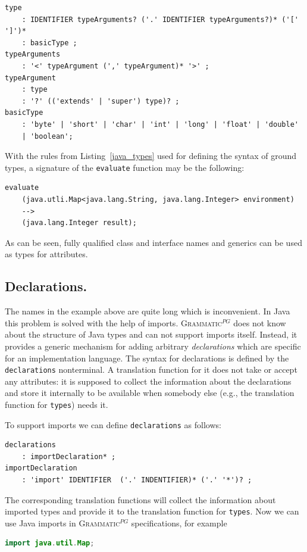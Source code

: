 \documentclass{informat} %
\newcommand{\lstref}[1]{Listing~\ref{#1}}
\newcommand{\ATF}{\textsc{Grammatic}$^{PG}$}
\begin{document}
{\begin{lstlisting}[caption=Ground type syntax for Java 5,float=htbp,label=java_types]
type
	: IDENTIFIER typeArguments? ('.' IDENTIFIER typeArguments?)* ('[' ']')*
	: basicType ;
typeArguments
	: '<' typeArgument (',' typeArgument)* '>' ;
typeArgument
	: type
	: '?' (('extends' | 'super') type)? ;
basicType
	: 'byte' | 'short' | 'char' | 'int' | 'long' | 'float' | 'double' 
	| 'boolean';
\end{lstlisting}


With the rules from \lstref{java_types} used for defining the syntax of ground types, a signature of the \texttt{evaluate} function may be the following:
\begin{lstlisting}
evaluate
	(java.utli.Map<java.lang.String, java.lang.Integer> environment) 
	--> 
	(java.lang.Integer result);
\end{lstlisting}
As can be seen, fully qualified class and interface names and generics can be used as types for attributes. 

\subsection{Declarations.}

The names in the example above are quite long which is inconvenient. In Java this problem is solved with the help of imports. \ATF{} does not know about the structure of Java types and can not support imports itself. Instead, it provides a generic mechanism for adding arbitrary \emph{declarations} which are specific for an implementation language. The syntax for declarations is defined by the \texttt{declarations} nonterminal. A translation function for it does not take or accept any attributes: it is supposed to collect the information about the declarations and store it internally to be available when somebody else (e.g., the translation function for \texttt{types}) needs it.

To support imports we can define \texttt{declarations} as follows:
\begin{lstlisting}
declarations
	: importDeclaration* ;
importDeclaration
	: 'import' IDENTIFIER  ('.' INDENTIFIER)* ('.' '*')? ;
\end{lstlisting}
The corresponding translation functions will collect the information about imported types and provide it to the translation function for \texttt{types}. Now we can use Java imports in \ATF{} specifications, for example
\begin{lstlisting}[language=Java]
import java.util.Map;


\end{lstlisting}}
\end{document}
